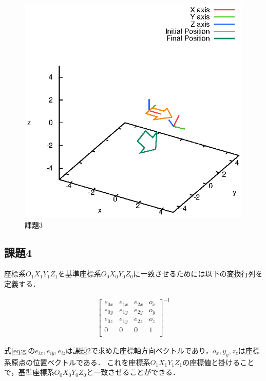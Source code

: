 \documentclass[a4paper,10pt]{jsarticle}
\begin{document}
\begin{figure}[htb]
  \begin{center}
    \includegraphics[clip,width=14cm]{fig/eps/3.eps}
  \end{center}
  \caption{課題3}
  \label{fig:課題3}
\end{figure}

\subsection{課題4}
座標系$O_1X_1Y_1Z_1$を基準座標系$O_0X_0Y_0Z_0$に一致させるためには以下の変換行列を定義する．

\begin{eqnarray}
\label{eq:g}
  \left[
    \begin{array}{cccc}
      e_{0x} & e_{1x} & e_{2x} & o_x \\
      e_{0y} & e_{1y} & e_{2y} & o_y\\
      e_{0z} & e_{1y} & e_{2z}& o_z\\
      0 & 0 & 0 & 1\\
    \end{array}
  \right]^{-1}
\end{eqnarray}

式\eqref{eq:g}の$e_{ix}, e_{iy}, e_{iz}$は課題2で求めた座標軸方向ベクトルであり，$o_{x}, y_{y}, z_{z}$は座標系原点の位置ベクトルである．
これを座標系$O_1X_1Y_1Z_1$の座標値と掛けることで，基準座標系$O_0X_0Y_0Z_0$と一致させることができる．
\end{document}
